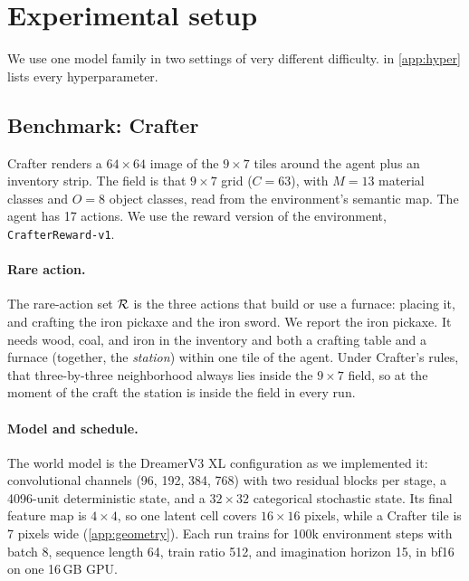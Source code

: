 \section{Experimental setup}
\label{sec:setup}

We use one model family in two settings of very different difficulty.
 in \cref{app:hyper} lists every hyperparameter.

\subsection{Benchmark: Crafter}
\label{sec:setup-crafter}

Crafter \citep{hafner2022crafter} renders a $64\times64$ image of the $9\times7$ tiles around the agent plus an inventory strip.
The field is that $9\times7$ grid ($C=63$), with $M=13$ material classes and $O=8$ object classes, read from the environment's semantic map.
The agent has 17 actions.
We use the reward version of the environment, \texttt{CrafterReward-v1}.

\paragraph{Rare action.}
The rare-action set $\mathcal{R}$ is the three actions that build or use a furnace: placing it, and crafting the iron pickaxe and the iron sword.
We report the iron pickaxe.
It needs wood, coal, and iron in the inventory and both a crafting table and a furnace (together, the \emph{station}) within one tile of the agent.
Under Crafter's rules, that three-by-three neighborhood always lies inside the $9\times7$ field, so at the moment of the craft the station is inside the field in every run.

\paragraph{Model and schedule.}
The world model is the DreamerV3 XL configuration as we implemented it: convolutional channels (96, 192, 384, 768) with two residual blocks per stage, a 4096-unit deterministic state, and a $32\times32$ categorical stochastic state.
Its final feature map is $4\times4$, so one latent cell covers $16\times16$ pixels, while a Crafter tile is 7 pixels wide (\cref{app:geometry}).
Each run trains for 100k environment steps with batch 8, sequence length 64, train ratio 512, and imagination horizon 15, in bf16 on one 16\,GB GPU.

